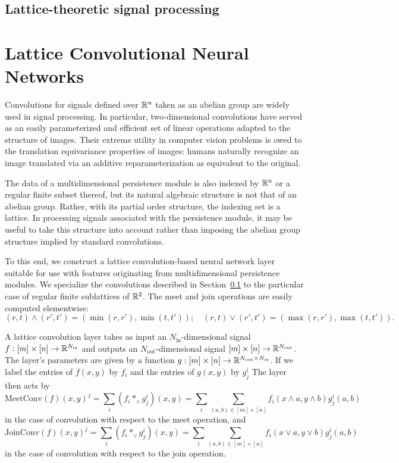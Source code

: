 \documentclass{article}
\begin{document}
\subsection{Lattice-theoretic signal processing}\label{sec:latticeconv}

\cite{pueschel_discrete_2019}
\section{Lattice Convolutional Neural Networks}\label{sec:latticeCNN}

Convolutions for signals defined over $\mathbb{R}^n$ taken as an abelian group are
widely used in signal processing. In particular, two-dimensional convolutions
have served as an easily parameterized and efficient set of linear operations
adapted to the structure of images. Their extreme utility in computer vision
problems is owed to the translation equivariance properties of images: humans
naturally recognize an image translated via an additive reparameterization as
equivalent to the original.

The data of a multidimensional persistence module is also indexed by $\mathbb{R}^n$ or a
regular finite subset thereof, but its natural algebraic structure is not that
of an abelian group. Rather, with its partial order structure, the indexing set
is a lattice. In processing signals associated with the persistence module, it
may be useful to take this structure into account rather than imposing the
abelian group structure implied by standard convolutions.

To this end, we construct a lattice convolution-based neural network layer
suitable for use with features originating from multidimensional persistence
modules. We specialize the convolutions described in
Section~\ref{sec:latticeconv} to the particular case of regular finite
sublattices of $\mathbb{R}^2$. The meet and join operations are easily computed
elementwise:
\[(r,t) \wedge (r',t') = (\min(r,r'),\min(t,t'));\quad (r,t)\vee (r',t') =
  (\max(r,r'),\max(t,t')).\]

A lattice convolution layer takes as input an $N_{\text{in}}$-dimensional signal
$f : [m] \times [n] \to \mathbb{R}^{N_{\text{in}}}$ and outputs an
$N_{\text{out}}$-dimensional signal $ [m] \times [n] \to
\mathbb{R}^{N_{\text{out}}}$. The layer's parameters are given by a function $g: [m]
\times [n] \to \mathbb{R}^{N_{\text{out}}\times N_{\text{in}}}$. If we label the
entries of $f(x,y)$ by $f_i$ and the entries of $g(x,y)$ by $g^i_j$ The layer then acts by
\[\text{MeetConv}(f)(x,y)^j = \sum_{i} (f_i \ast_{\wedge} g^i_j)(x,y) = \sum_i
  \sum_{(a,b) \in [m]\times [n]} f_i(x \wedge a, y \wedge b)g^i_j(a,b)\]
in the case of convolution with respect to the meet operation, and
\[\text{JoinConv}(f)(x,y)^j = \sum_{i} (f_i \ast_{\vee} g^i_j)(x,y) = \sum_i
  \sum_{(a,b) \in [m]\times [n]} f_i(x \vee a, y \vee b)g^i_j(a,b)\]
in the case of convolution with respect to the join operation.
\end{document}
